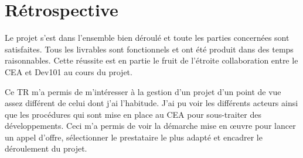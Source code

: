 \section{Rétrospective}

Le projet s'est dans l'ensemble bien déroulé et toute les parties concernées sont satisfaites. Tous les livrables sont fonctionnels et ont été produit dans des temps raisonnables. Cette réussite est en partie le fruit de l'étroite collaboration entre le CEA et Dev101 au cours du projet.

Ce TR m’a permis de m’intéresser à la gestion d’un projet d’un point de vue assez différent de celui dont j'ai l'habitude. J’ai pu voir les différents acteurs ainsi que les procédures qui sont mise en place au CEA pour sous-traiter des développements. Ceci m'a permis de voir la démarche mise en œuvre pour lancer un appel d'offre, sélectionner le prestataire le plus adapté et encadrer le déroulement du projet.




